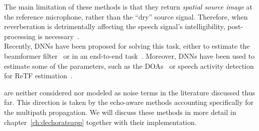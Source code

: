 The main limitation of these methods is that they return \textit{spatial source image} at the reference microphone, rather than the ``dry'' source signal.
Therefore, when reverberation is detrimentally affecting the speech signal's intelligibility, post-processing is necessary~.
\\Recently, \acp{DNN} have been proposed for solving this task, either to estimate the beamformer filter~ or in an end-to-end task~.
Moreover, \acp{DNN} have been used to estimate some of the parameters, such as the \acp{DOA}~ or speech activity detection for \ac{ReTF} estimation~.

 are neither considered nor modeled as noise terms in the literature discussed thus far.
This direction is taken by the echo-aware methods accounting specifically for the multipath propagation.
We will discuss these methods in more detail in chapter~\cref{ch:dechorateapp} together with their implementation.

